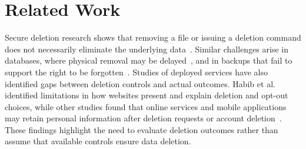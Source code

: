 \section{Related Work}
\label{sec:related}







%
Secure deletion research shows that removing a file or issuing a deletion command does not necessarily eliminate the underlying data~\cite{reardon2013sok}.
%
Similar challenges arise in databases, where physical removal may be delayed~\cite{sarkar2020lethe,shastri2020understanding}, and in backups that fail to support the right to be forgotten~\cite{politou2018backups}.
%
Studies of deployed services have also identified gaps between deletion controls and actual outcomes.
%
Habib et al.~\cite{habib2019empirical} identified limitations in how websites present and explain deletion and opt-out choices, while other studies found that online services and mobile applications may retain personal information after deletion requests or account deletion~\cite{rupp2022leave,santhanam2022scraping,yan2025sign}.
%
These findings highlight the need to evaluate deletion outcomes rather than assume that available controls ensure data deletion.

